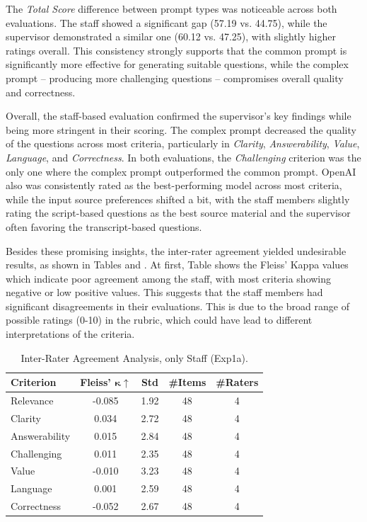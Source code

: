 The \textit{Total Score} difference between prompt types was noticeable across both evaluations. The staff showed a significant gap (57.19 vs. 44.75), while the supervisor demonstrated a similar one (60.12 vs. 47.25), with slightly higher ratings overall. This consistency strongly supports that the common prompt is significantly more effective for generating suitable questions, while the complex prompt -- producing more challenging questions -- compromises overall quality and correctness.

Overall, the staff-based evaluation confirmed the supervisor's key findings while being more stringent in their scoring. The complex prompt decreased the quality of the questions across most criteria, particularly in \textit{Clarity}, \textit{Answerability}, \textit{Value}, \textit{Language}, and \textit{Correctness}. In both evaluations, the \textit{Challenging} criterion was the only one where the complex prompt outperformed the common prompt. OpenAI also was consistently rated as the best-performing model across most criteria, while the input source preferences shifted a bit, with the staff members slightly rating the script-based questions as the best source material and the supervisor often favoring the transcript-based questions.

Besides these promising insights, the inter-rater agreement yielded undesirable results, as shown in Tables  and . At first, Table  shows the Fleiss' Kappa values which indicate poor agreement among the staff, with most criteria showing negative or low positive values. This suggests that the staff members had significant disagreements in their evaluations. This is due to the broad range of possible ratings (0-10) in the rubric, which could have lead to different interpretations of the criteria. 

\begin{table}[H]
   \centering
   \caption{Inter-Rater Agreement Analysis, only Staff (Exp1a).} 
   \label{tab:iaa-staff-1a}
   \begin{tabular}{lcccc}
        \toprule
        \textbf{Criterion} & \textbf{Fleiss' $\mathbf{\kappa}\uparrow$} & \textbf{Std} & \textbf{\#Items} & \textbf{\#Raters} \\
        \midrule
        Relevance      & -0.085 & 1.92 & 48 & 4 \\
        Clarity        &  0.034 & 2.72 & 48 & 4 \\
        Answerability  &  0.015 & 2.84 & 48 & 4 \\
        Challenging    &  0.011 & 2.35 & 48 & 4 \\
        Value          & -0.010 & 3.23 & 48 & 4 \\
        Language       &  0.001 & 2.59 & 48 & 4 \\
        Correctness    & -0.052 & 2.67 & 48 & 4 \\
        \bottomrule
   \end{tabular}
\end{table}

